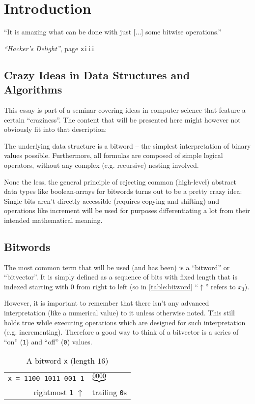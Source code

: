 \section{Introduction}\label{sec:introduction}
\epigraph{
``It is amazing what can be done
with just [...] some bitwise operations.''
}{
\emph{``Hacker's Delight''}, page \texttt{xiii}
\cite{Warren:2012:HD:2462741}
}


\subsection*{Crazy Ideas in Data Structures and Algorithms}
This essay is part of a seminar covering
ideas in computer science that feature a certain ``craziness''.
The content that will be presented here
might however not obviously fit into that description:

The underlying data structure is a bitword
-- the simplest interpretation of binary values possible.
Furthermore, all formulas are composed of simple logical operators,
without any complex (e.g. recursive) nesting involved.

None the less, the general principle of rejecting
common (high-level) abstract data types like boolean-arrays
for bitwords turns out to be a pretty crazy idea:
Single bits aren't directly accessible (requires copying and shifting)
and operations like increment will be used for
purposes differentiating a lot from their intended mathematical meaning.


\subsection*{Bitwords}
The most common term that will be used (and has been)
is a ``bitword'' or ``bitvector''.
It is simply defined as a sequence of bits with fixed length
that is indexed starting with $0$ from right to left
(so in \autoref{table:bitword} ``$\uparrow$'' refers to $x_3$).

However, it is important to remember that
there isn't any advanced interpretation (like a numerical value) to it
unless otherwise noted.
This still holds true while executing operations
which are designed for such interpretation (e.g. incrementing).
Therefore a good way to think of a bitvector
is a series of ``on'' (\lstinline$1$) and ``off'' (\lstinline$0$) values.

\begin{table}[h]
\begin{tabular}{rl}
\lstinline$x = 1100 1011 001 1$ & $\underbrace{\text{\lstinline$0000$}}$\\
rightmost \lstinline$1$ $\uparrow$ & trailing \lstinline$0$s\\
\end{tabular}
\caption{A bitword \lstinline$x$ (length $16$)}
\label{table:bitword}
\end{table}

